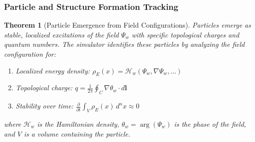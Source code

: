 \documentclass[11pt,a4paper]{article}
\newtheorem{theorem}{Theorem}[section]
\begin{document}
\subsubsection{Particle and Structure Formation Tracking}
\label{ssubsec:particle_formation}

\begin{theorem}[Particle Emergence from Field Configurations]
\label{thm:particle_emergence}
Particles emerge as stable, localized excitations of the field $\Psi_w$ with specific topological charges and quantum numbers. The simulator identifies these particles by analyzing the field configuration for:
\begin{enumerate}
    \item Localized energy density: $\rho_E(x) = \mathcal{H}_w(\Psi_w, \nabla\Psi_w, \ldots)$
    \item Topological charge: $q = \frac{1}{2\pi} \oint_C \nabla\theta_w \cdot d\mathbf{l}$
    \item Stability over time: $\frac{\partial}{\partial t} \int_V \rho_E(x) \, d^nx \approx 0$
\end{enumerate}
where $\mathcal{H}_w$ is the Hamiltonian density, $\theta_w = \arg(\Psi_w)$ is the phase of the field, and $V$ is a volume containing the particle.
\end{theorem}
\end{document}
